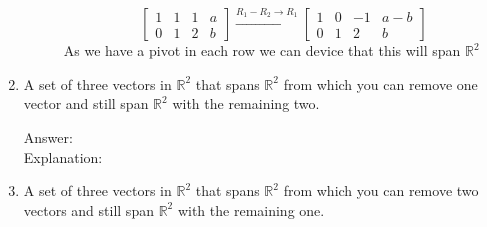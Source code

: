\documentclass{article}
\begin{document}
\begin{enumerate}
\begin{description}
                                    \[
                                    \left[\begin{array}{ccc|c}
                                    1 & 1 & 1 & a \\
                                    0 & 1 & 2 & b
                                    \end{array}\right]
                                    \xrightarrow{R_1 - R_2 \rightarrow R_1}
                                    \left[\begin{array}{ccc|c}
                                    1 & 0 & -1 & a - b \\
                                    0 & 1 & 2 & b
                                    \end{array}\right]
                                    \]
                                    As we have a pivot in each row we can device that this will span $\mathbb{R}^2$
                            \end{description}
                        \item 
                            A set of three vectors in $\mathbb{R}^2$ that spans $\mathbb{R}^2$ from which you can remove
                            one vector and still span $\mathbb{R}^2$ with the remaining two.
                            \begin{description}
                                \item[Answer:] 
                                    
                                \item[Explanation:]
                                    
                            \end{description}
                        \item 
                            A set of three vectors in $\mathbb{R}^2$ that spans $\mathbb{R}^2$ from which you can remove two
                            vectors and still span $\mathbb{R}^2$ with the remaining one.
                    \end{enumerate}
                        
                        
\clearpage


\end{document}
